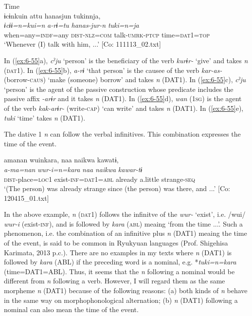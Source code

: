 \ex Time\\
{\TM}
\glll  ɨcɨnkuin  attu  hanasjun   tukinnja,\\
\textit{ɨcɨɨ=n=kui=n}  \textit{a-rɨ=tu}  \textit{hanas-jur-n} \textit{tuki=n=ja}\\
when=any=\textsc{indf}=any  \textsc{dist}-\textsc{nlz}=\textsc{com}  talk-\textsc{umrk}-\textsc{ptcp}    time=\textsc{dat}1=\textsc{top}\\
\glt ‘Whenever (I) talk with him, ...’ [Co: 111113\_02.txt]
\z
\z

In (\ref{ex:6-55}a), \textit{cˀju} ‘person’ is the beneficiary of the verb \textit{kurɨr-} ‘give’ and takes \textit{n} (\textsc{dat}1). In (\ref{ex:6-55}b), \textit{a-rɨ} ‘that person’ is the causee of the verb \textit{kar-as-} (borrow-\textsc{caus}) ‘make (someone) borrow’ and takes \textit{n} (DAT1). In (\ref{ex:6-55}c), \textit{cˀju} ‘person’ is the agent of the passive construction whose predicate includes the passive affix \textit{-arɨr} and it takes \textit{n} (DAT1). In (\ref{ex:6-55}d), \textit{wan} (1\textsc{sg}) is the agent of the verb \textit{kak-arɨr-} (write-\textsc{cap}) ‘can write’ and takes \textit{n} (DAT1). In (\ref{ex:6-55}e), \textit{tuki} ‘time’ takes \textit{n} (DAT1).

  The dative 1 \textit{n} can follow the verbal infinitives. This combination expresses the time of the event.

\ea\label{ex:6-56}
{\TM}
\glll amanan  wuinkara,  naa  naikwa  kawatɨ,\\
\textit{a-ma=nan}  \textit{wur-i=n=kara}  \textit{naa}  \textit{naikwa}  \textit{kawar-tɨ}\\
\textsc{dist}-place=\textsc{loc1}  exist-\textsc{inf}=\textsc{dat}1=\textsc{abl}  already  a.little  strange-\textsc{seq}\\
\glt    ‘(The person) was already strange since (the person) was there, and ...’ [Co: 120415\_01.txt]
\z

In the above example, \textit{n} (\textsc{dat}1) follows the infinitve of the \textit{wur-} ‘exist’, i.e. /wui/ \textit{wur-i} (exist-\textsc{inf}), and is followed by \textit{kara} (\textsc{abl}) meaing ‘from the time ...’. Such a phenomenon, i.e. the combination of an infinitive plus \textit{n} (DAT1) meaing the time of the event, is said to be common in Ryukyuan languages (Prof. Shigehisa Karimata, 2013 p.c.). There are no examples in my texts where \textit{n} (DAT1) is followed by \textit{kara} (ABL) if the preceding word is a nominal, e.g. *\textit{tuki=n=kara} (time=DAT1=ABL). Thus, it seems that the \textit{n} following a nominal would be different from \textit{n} following a verb. However, I will regard them as the same morpheme \textit{n} (DAT1) because of the following reasons: (a) both kinds of \textit{n} behave in the same way on morphophonological alternation; (b) \textit{n} (DAT1) following a nominal can also mean the time of the event.


